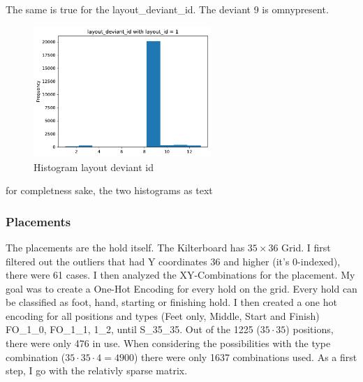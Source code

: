 \documentclass{article}
\begin{document}
The same is true for the layout\_deviant\_id. The deviant 9 is omnypresent.

\begin{figure}[H]
    \centering
    \includegraphics[width=0.6\textwidth]{../DataAnalysis/histogram_layout_deviant_id.pdf}
    \caption{Histogram layout deviant id}\label{fig:histogram_layout_deviant_id}
\end{figure}

for completness sake, the two histograms as text

\begin{minipage}{0.45\textwidth}
    \centering
    
\end{minipage}
\hfill
\begin{minipage}{0.45\textwidth}
        
\end{minipage}

\subsubsection{Placements}

The placements are the hold itself. The Kilterboard has $35\times36$ Grid.
I first filtered out the outliers that had Y coordinates 36 and higher (it's 0-indexed), there were 61 cases.
I then analyzed the XY-Combinations for the placement. My goal was to create a One-Hot Encoding for every hold on the grid.
Every hold can be classified as foot, hand, starting or finishing hold. 
I then created a one hot encoding for all positions and types (Feet only, Middle, Start and Finish) FO\_1\_0, FO\_1\_1, 1\_2, until S\_35\_35.
Out of the 1225 ($35\cdot35$) positions, there were only 476 in use. 
When considering the possibilities with the type combination ($35\cdot35\cdot4 = 4900$) there were only 1637 combinations used.
As a first step, I go with the relativly sparse matrix.
\end{document}
